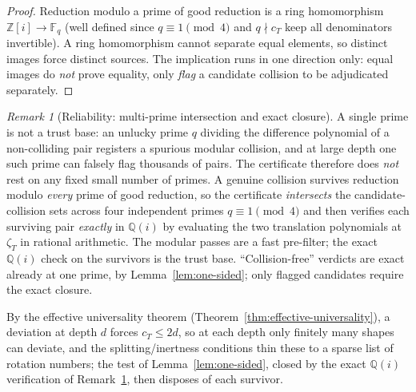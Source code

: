 \documentclass[11pt]{article}
\theoremstyle{plain}
\theoremstyle{definition}
\theoremstyle{remark}
\newtheorem{remark}[theorem]{Remark}
\begin{document}
\begin{proof}
Reduction modulo a prime of good reduction is a ring homomorphism
$\mathbb{Z}[i]\to\mathbb{F}_q$ (well defined since $q\equiv1\pmod 4$ and
$q\nmid c_T$ keep all denominators invertible). A ring homomorphism
cannot separate equal elements, so distinct images force distinct
sources. The implication runs in one direction only: equal images do
\emph{not} prove equality, only \emph{flag} a candidate collision to be
adjudicated separately.
\end{proof}

\begin{remark}[Reliability: multi-prime intersection and exact closure]
\label{rem:multiprime}
A single prime is not a trust base: an unlucky prime $q$ dividing the
difference polynomial of a non-colliding pair registers a spurious
modular collision, and at large depth one such prime can falsely flag
thousands of pairs. The certificate therefore does \emph{not} rest on
any fixed small number of primes. A genuine collision survives reduction
modulo \emph{every} prime of good reduction, so the certificate
\emph{intersects} the candidate-collision sets across four independent
primes $q\equiv1\pmod 4$ and then verifies each surviving pair
\emph{exactly} in $\mathbb{Q}(i)$ by evaluating the two translation
polynomials at $\zeta_T$ in rational arithmetic. The modular passes are a
fast pre-filter; the exact $\mathbb{Q}(i)$ check on the survivors is the
trust base. ``Collision-free'' verdicts are exact already at one prime,
by Lemma~\ref{lem:one-sided}; only flagged candidates require the exact
closure.
\end{remark}

By the effective universality theorem
(Theorem~\ref{thm:effective-universality}), a deviation at depth $d$
forces $c_T\le 2d$, so at each depth only finitely many shapes can
deviate, and the splitting/inertness conditions thin these to a sparse
list of rotation numbers; the test of Lemma~\ref{lem:one-sided}, closed
by the exact $\mathbb{Q}(i)$ verification of
Remark~\ref{rem:multiprime}, then disposes of each survivor.
\end{document}
